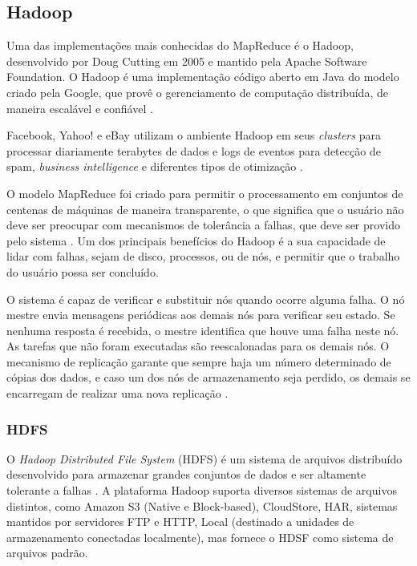 \subsection{Hadoop}
Uma das implementações mais conhecidas do MapReduce é o Hadoop, desenvolvido por Doug Cutting em 2005 e mantido pela Apache Software Foundation. O Hadoop é uma implementação código aberto em Java do modelo criado pela Google, que provê o gerenciamento de computação distribuída, de maneira escalável e confiável \cite{Hadoop:2010}.

Facebook, Yahoo! e eBay utilizam o ambiente Hadoop em seus \textit{clusters} para processar diariamente terabytes de dados e logs de eventos para detecção de spam, \textit{business intelligence} e diferentes tipos de otimização \cite{Cherkasova:2011}.


O modelo MapReduce foi criado para permitir o processamento em conjuntos de centenas de máquinas de maneira transparente, o que significa que o usuário não deve ser preocupar com mecanismos de tolerância a falhas, que deve ser provido pelo sistema \cite{Dean:2008}. 
Um dos principais benefícios do Hadoop é a sua capacidade de lidar com falhas, sejam de disco, processos, ou de nós, e permitir que o trabalho do usuário possa ser concluído.

O sistema é capaz de verificar e substituir nós quando ocorre alguma falha. O nó mestre envia mensagens periódicas aos demais nós para verificar seu estado. Se nenhuma resposta é recebida, o mestre identifica que houve uma falha neste nó. 
As tarefas que não foram executadas são reescalonadas para os demais nós. O mecanismo de replicação garante que sempre haja um número determinado de cópias dos dados, e caso um dos nós de armazenamento seja perdido, os demais se encarregam de realizar uma nova replicação \cite{Hadoop:2010}.



\subsubsection{HDFS}


O \textit{ Hadoop Distributed File System} (HDFS) é um sistema de arquivos distribuído desenvolvido para armazenar grandes conjuntos de dados e ser altamente tolerante a falhas \cite{Hadoop:2010}.
A plataforma Hadoop suporta diversos sistemas de arquivos distintos, como Amazon S3 (Native e Block-based), CloudStore, HAR, sistemas mantidos por servidores FTP e HTTP, Local (destinado a unidades de armazenamento conectadas localmente), mas fornece o HDSF como sistema de arquivos padrão.

